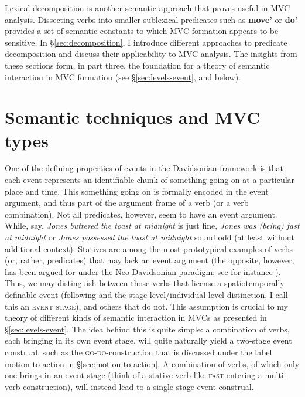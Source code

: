 Lexical decomposition is another semantic approach that proves useful in MVC analysis. Dissecting verbs into smaller sublexical predicates such as \textbf{move'} or \textbf{do'} provides a set of semantic constants to which MVC formation appears to be sensitive. In §\ref{sec:decomposition}, I introduce different approaches to predicate decomposition and discuss their applicability to MVC analysis. The insights from these sections form, in part three, the foundation for a theory of semantic interaction in MVC formation (see §\ref{sec:levels-event}, and below).

\section*{Semantic techniques and MVC types}

One of the defining properties of events in the Davidsonian framework is that each event represents an identifiable chunk of something going on at a particular place and time. This something going on is formally encoded in the event argument, and thus part of the argument frame of a verb (or a verb combination). Not all predicates, however, seem to have an event argument. While, say, \textit{Jones buttered the toast at midnight} is just fine, \textit{Jones was (being) fast at midnight} or \textit{Jones possessed the toast at midnight} sound odd (at least without additional context). Statives are among the most prototypical examples of verbs (or, rather, predicates) that may lack an event argument (the opposite, however, has been argued for under the Neo-Davidsonian paradigm; see for instance \citealt{higginbotham2000events}). Thus, we may distinguish between those verbs that license a spatiotemporally definable event (following \citealt{carlson1977reference} and the stage-level/individual-level distinction, I call this an \textsc{event stage}), and others that do not. This assumption is crucial to my theory of different kinds of semantic interaction in MVCs as presented in §\ref{sec:levels-event}. The idea behind this is quite simple: a combination of verbs, each bringing in its own event stage, will quite naturally yield a two-stage event construal, such as the \textsc{go-do}-construction that is discussed under the label motion-to-action in §\ref{sec:motion-to-action}. A combination of verbs, of which only one brings in an event stage (think of a stative verb like \textsc{fast} entering a multi-verb construction), will instead lead to a single-stage event construal.

